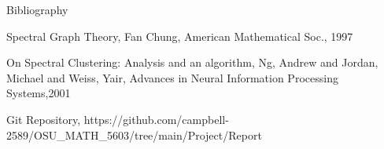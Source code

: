 \documentclass{beamer}
\begin{document}
\begin{frame}{Bibliography}
\begin{thebibliography}{10}
Spectral Graph Theory, Fan Chung, American Mathematical Soc., 1997

On Spectral Clustering: Analysis and an algorithm, Ng, Andrew and Jordan, Michael and Weiss, Yair, Advances in Neural Information Processing Systems,2001

Git Repository, https://github.com/campbell-2589/OSU\_MATH\_5603/tree/main/Project/Report

\end{thebibliography}
\end{frame}


%         
\end{document}
